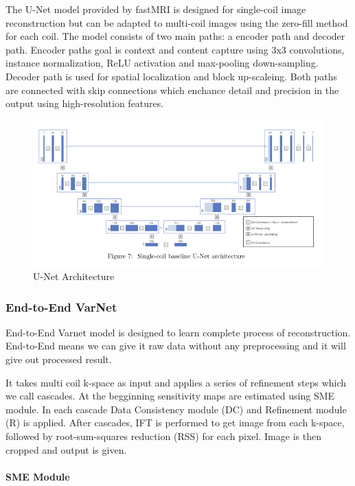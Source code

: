 \documentclass[10pt,a4paper]{article}
\begin{document}
The U-Net model provided by fastMRI is designed for single-coil image reconstruction but can be adapted to multi-coil images using the zero-fill method for each coil. The model consists of two main paths: a encoder path and decoder path. Encoder paths goal is context and content capture using 3x3 convolutions, instance normalization, ReLU activation and max-pooling down-sampling. Decoder path is used for spatial localization and block up-scaleing. Both paths are connected with skip connections which enchance detail and precision in the output using high-resolution features. \cite{ronneberger2015unet} \cite{zbontar2019fastmri}

\begin{figure}[H]
\centering
\includegraphics[scale=0.5]{images/unet-architecture.png}
\caption{U-Net Architecture \cite{zbontar2019fastmri}}
\end{figure}

\newpage
\subsubsection{End-to-End VarNet}

End-to-End Varnet model is designed to learn complete process of reconstruction. End-to-End means we can give it raw data without any preprocessing and it will give out processed result. \cite{sriram2020endtoend}

It takes multi coil k-space as input and applies a series of refinement steps which we call cascades. At the begginning sensitivity maps are estimated using SME module. In each cascade Data Consistency module (DC) and Refinement module (R) is applied. After cascades, IFT is performed to get image from each k-space, followed by root-sum-squares reduction (RSS) for each pixel. Image is then cropped and output is given. \cite{sriram2020endtoend}

\paragraph{SME Module}
\end{document}
